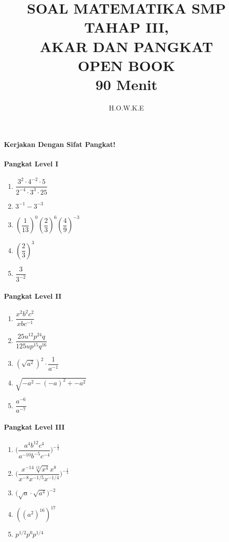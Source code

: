 \documentclass[12pt,a4paper,twocolumn]{article}
\author{H.O.W.K.E}
\title{SOAL MATEMATIKA SMP TAHAP III, \\ AKAR DAN PANGKAT\\ \textbf{OPEN BOOK}\\ \textbf{90 Menit}}
\begin{document}
	\maketitle
	\paragraph{Kerjakan Dengan Sifat Pangkat!}
	
	\paragraph{Pangkat Level I}
		\begin{enumerate}
			\item $\dfrac{3^2\cdot 4^{-2} \cdot 5}{2^{-4}\cdot 3^3\cdot 25}$
			\item $3^{-1}-3^{-3}$
			\item $(\dfrac{1}{13})^0(\dfrac{2}{3})^6(\dfrac{4}{9})^{-3}$
			\item $(\dfrac{2}{3})^{3}$
			\item $\dfrac{3}{3^{-2}} $
		\end{enumerate}
	\paragraph{Pangkat Level II}
	\begin{enumerate}
		\item $\dfrac{x^2b^2c^2}{xbc^{-1}}$
		\item $\dfrac{25u^{12}p^{24}q}{125up^{15}q^{16}}$
		\item $(\sqrt{{a^2}})^2\cdot\dfrac{1}{a^{-1}}$
		\item $\sqrt{-a^{2}-(-a)^{2}+{-a^2}}$
		\item $\dfrac{a^{-6}}{a^{-7}}$
	\end{enumerate}
		
	\paragraph{Pangkat Level III}
		\begin{enumerate}
			\item $\Big(\dfrac{a^{4}b^{12}c^{4}}{a^{-10}b^{-5}c^{-4}}\Big)^{-\frac{1}{2}} $
			\item $\Big(\dfrac{x^{-14}\sqrt[12]{x^{4}}x^{8}}{x^{-8}x^{-1/5}x^{-1/4}}\Big)^{-\frac{1}{2}} $
			\item $\Big(\sqrt{a}\cdot\sqrt{a^4}\Big)^{-2}$
			\item $((a^2)^{16})^{17}$
			\item $p^{1/2}p^{0}p^{1/4}$
		\end{enumerate}
\end{document}

